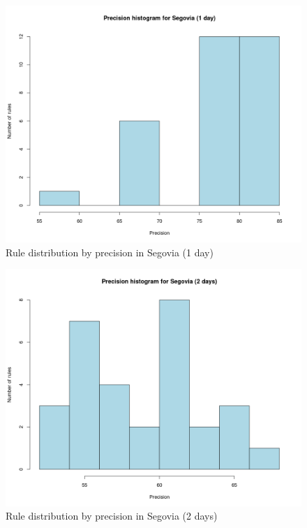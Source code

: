 \documentclass[a4paper,12pt]{article}
\begin{document}
\begin{figure}[hbtp]
\includegraphics[width=\textwidth]{img/hist_seg1.png}
\caption{Rule distribution by precision in Segovia (1 day)} \label{fig:hist_seg1}
\end{figure}

\begin{figure}[hbtp]
\includegraphics[width=\textwidth]{img/hist_seg2.png}
\caption{Rule distribution by precision in Segovia (2 days)} \label{fig:hist_seg2}
\end{figure}
\end{document}
